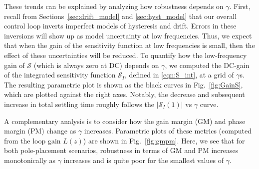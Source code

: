 \documentclass[twocolumn,twoside]{IEEEtran}
\begin{document}
These trends can be explained by analyzing how robustness depends on $\gamma$. First, recall from Sections~\ref{sec:drift_model} and \ref{sec:hyst_model} that our overall control loop inverts imperfect models of hysteresis and drift. Errors in these inversions will show up as model uncertainty at low frequencies. Thus, we expect that when the gain of the sensitivity function at low frequencies is small, then the effect of these uncertainties will be reduced. To quantify how the low-frequency gain of $\mathcal{S}$ (which is always zero at DC) depends on $\gamma$, we computed the DC-gain of the integrated sensitivity function $\mathcal{S}_I$, defined in \eqref{eqn:S_int}, at a grid of $\gamma$s. The resulting parametric plot is shown as the black curves in Fig.~\ref{fig:GainS}, which are plotted against the right axes. Notably, the decrease and subsequent increase in total settling time roughly follows the $|\mathcal{S}_I(1)|$ vs $\gamma$ curve.

A complementary analysis is to consider how the gain margin (GM) and phase margin (PM) change as $\gamma$ increases. Parametric plots of these metrics (computed from the loop gain $L(z)$) are shown in Fig.~\ref{fig:gmpm}. 
Here, we see that for both pole-placement scenarios, robustness in terms of GM and PM increases monotonically as $\gamma$ increases and is quite poor for the smallest values of $\gamma$.
\end{document}
